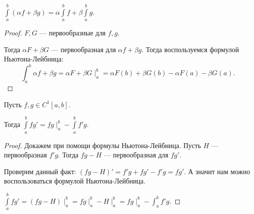\begin{theorem}
    $\int\limits_a^b(\alpha f + \beta g) = \alpha \int\limits_a^b f + \beta \int\limits_a^b g$.
\end{theorem}
\begin{proof}
    $F, G$ --- первообразные для  $f, g$.

    Тогда  $\alpha F + \beta G$ --- первообразная для  $\alpha f + \beta g$. Тогда воспользуемся формулой Ньютона-Лейбница:  \[
        \int_a^b \alpha f + \beta g = \alpha F + \beta G \mid_a^b = \alpha F(b) + \beta G(b) - \alpha F(a) - \beta G(a)
    .\] 
\end{proof}
\begin{theorem}
    Пусть $f, g \in C^{1}[a, b]$.

    Тогда  $\int\limits_a^b fg' = fg \mid_a^b - \int\limits_a^bf'g$.
\end{theorem}
\begin{proof}
    Докажем при помощи формулы Ньютона-Лейбница. Пусть $H$ --- первообразная  $f'g$. Тогда  $fg - H$ --- первообразная для $fg'$.

    Проверим данный факт: $\left(fg - H\right)' = f'g + fg' - f'g = fg'$. А значит нам можно воспользоваться формулой Ньютона-Лейбница.

    $\int\limits_a^b fg' = \left(fg - H\right) \mid_a^b = fg \mid_a^b - H\mid_a^b = fg\mid_a^b - \int_a^b f'g$.
\end{proof}

